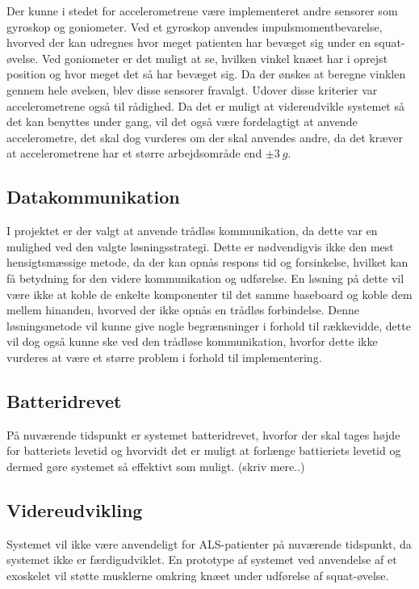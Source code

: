 Der kunne i stedet for accelerometrene være implementeret andre sensorer som gyroskop og goniometer. Ved et gyroskop anvendes impulsmomentbevarelse, hvorved der kan udregnes hvor meget patienten har bevæget sig under en squat-øvelse. Ved goniometer er det muligt at se, hvilken vinkel knæet har i oprejst position og hvor meget det så har bevæget sig. Da der ønskes at beregne vinklen gennem hele øvelsen, blev disse sensorer fravalgt. Udover disse kriterier  var accelerometrene også til rådighed. Da det er muligt at videreudvikle systemet så det kan benyttes under gang, vil det også være fordelagtigt at anvende accelerometre, det skal dog vurderes om der skal anvendes andre, da det kræver at accelerometrene har et større arbejdsområde end $\pm3~g$.

\subsection{Datakommunikation}
I projektet er der valgt at anvende trådløs kommunikation, da dette var en mulighed ved den valgte løsningsstrategi. Dette er nødvendigvis ikke den mest hensigtsmæssige metode, da der kan opnås respons tid og forsinkelse, hvilket kan få betydning for den videre kommunikation og udførelse. En løsning på dette vil være ikke at koble de enkelte komponenter til det samme baseboard og koble dem mellem hinanden, hvorved der ikke opnås en trådløs forbindelse. Denne løsningsmetode vil kunne give nogle begrænsninger i forhold til rækkevidde, dette vil dog også kunne ske ved den trådløse kommunikation, hvorfor dette ikke vurderes at være et større problem i forhold til implementering. 


\subsection{Batteridrevet}
På nuværende tidspunkt er systemet batteridrevet, hvorfor der skal tages højde for batteriets levetid og hvorvidt det er muligt at forlænge battieriets levetid og dermed gøre systemet så effektivt som muligt. (skriv mere..)

\subsection{Videreudvikling}
Systemet vil ikke være anvendeligt for ALS-patienter på nuværende tidspunkt, da systemet ikke er færdigudviklet. En prototype af systemet ved anvendelse af et exoskelet vil støtte musklerne omkring knæet under udførelse af squat-øvelse. 

